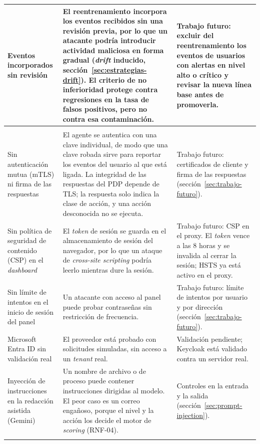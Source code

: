 \begin{longtable}{>{\raggedright\arraybackslash}p{4.4cm}>{\raggedright\arraybackslash}p{5.0cm}>{\raggedright\arraybackslash}p{4.7cm}}
	\hline
	Eventos incorporados sin revisión & El reentrenamiento incorpora los eventos recibidos sin una revisión previa, por lo que un atacante podría introducir actividad maliciosa en forma gradual (\emph{drift} inducido, sección~\ref{sec:estrategias-drift}). El criterio de no inferioridad protege contra regresiones en la tasa de falsos positivos, pero no contra esa contaminación. & Trabajo futuro: excluir del reentrenamiento los eventos de usuarios con alertas en nivel alto o crítico y revisar la nueva línea base antes de promoverla. \\
	\hline
	\multicolumn{3}{l}{\textit{Autenticación y comunicaciones}} \\
	\hline
	Sin autenticación mutua (mTLS) ni firma de las respuestas & El agente se autentica con una clave individual, de modo que una clave robada sirve para reportar los eventos del usuario al que está ligada. La integridad de las respuestas del PDP depende de TLS; la respuesta solo indica la clase de acción, y una acción desconocida no se ejecuta. & Trabajo futuro: certificados de cliente y firma de las respuestas (sección~\ref{sec:trabajo-futuro}). \\
	\hline
	Sin política de seguridad de contenido (CSP) en el \emph{dashboard} & El \emph{token} de sesión se guarda en el almacenamiento de sesión del navegador, por lo que un ataque de \emph{cross-site scripting} podría leerlo mientras dure la sesión. & Trabajo futuro: CSP en el proxy. El \emph{token} vence a las 8 horas y se invalida al cerrar la sesión; HSTS ya está activo en el proxy. \\
	\hline
	Sin límite de intentos en el inicio de sesión del panel & Un atacante con acceso al panel puede probar contraseñas sin restricción de frecuencia. & Trabajo futuro: límite de intentos por usuario y por dirección (sección~\ref{sec:trabajo-futuro}). \\
	\hline
	Microsoft Entra ID sin validación real & El proveedor está probado con solicitudes simuladas, sin acceso a un \emph{tenant} real. & Validación pendiente; Keycloak está validado contra un servidor real. \\
	\hline
	Inyección de instrucciones en la redacción asistida (Gemini) & Un nombre de archivo o de proceso puede contener instrucciones dirigidas al modelo. El peor caso es un correo engañoso, porque el nivel y la acción los decide el motor de \emph{scoring} (RNF-04). & Controles en la entrada y la salida (sección~\ref{sec:prompt-injection}). \\
	\hline
	\multicolumn{3}{l}{\textit{Operación}} \\

\end{longtable}
